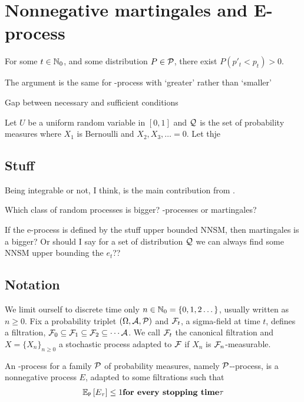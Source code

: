 \clearpage

\section{Nonnegative martingales and E-process}

\begin{define}[inadmissible]
	For some $t\in\mathbb{N}_0$, and some distribution $P\in\mathcal{P}$, there exist $P(p'_t < p_t) >0$.
\end{define}
The argument is the same for \E-process with `greater' rather than `smaller'


Gap between necessary and sufficient conditions
\begin{example}
	Let $U$ be a uniform random variable in $[0,1]$ and $\mathcal{Q}$ is the set of 
	probability measures where $X_1$ is Bernoulli and $X_2,X_3,\dots=0$.
	Let thje
\end{example}

\subsection{Stuff}
Being integrable or not, I think, is the main contribution from \cite{wangExtendedVillesInequality2024}.

\begin{question}
	Which class of random processes is bigger? \E-processes or martingales?
\end{question}

If the e-process is defined by the stuff upper bounded NNSM, then martingales is a bigger?
Or should I say for a set of distribution $\mathcal{Q}$ we can always find some NNSM
upper bounding the $e_t$??

\subsection{Notation}
We limit ourself to discrete time only $n\in\mathbb{N}_0=\{0,1,2\dots\}$, usually written as $n\geq 0$.
Fix a probability triplet $(\Omega,\mathcal{A},\mathcal{P})$ and $\mathcal{F}_t$, a sigma-field at time $t$, defines
a filtration, $\mathcal{F}_0\subseteq\mathcal{F}_1\subseteq\mathcal{F}_2\subseteq\cdots\mathcal{A}$.
We call $\mathcal{F}_t$ the canonical filtration and $X=\{X_n\}_{n\geq 0}$ a stochastic
process adapted to $\mathcal{F}$ if $X_n$ is $\mathcal{F}_n$-measurable.



\begin{define}
	An \E-process for a family $\mathcal{P}$ of probability measures, namely $\mathcal{P}$-\E-process,
	is a nonnegative process $E$, adapted to some filtrations such that
	\begin{align*}
		\ERWi{\Pt}{E_{\tau}} \leq 1 \qq{for every stopping time} \tau
	\end{align*}
\end{define}

